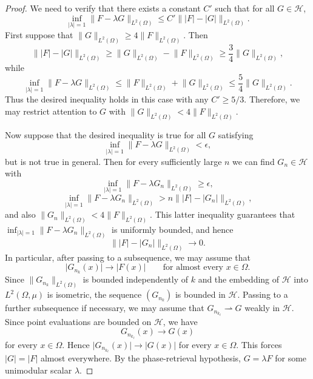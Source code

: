 \documentclass[11pt]{amsart}
\theoremstyle{remark}
\begin{document}
\begin{proof}
We need to verify that there exists a constant \(C'\) such that for all
\(G\in \mathcal{H}\),
\[
\inf_{\lvert \lambda \rvert=1}\lVert F-\lambda G \rVert_{L^2(\Omega)}
\le
C'\lVert \lvert F \rvert-\lvert G \rvert \rVert_{L^2(\Omega)}.
\]
First suppose that \(\lVert G \rVert_{L^2(\Omega)}\ge4\lVert F \rVert_{L^2(\Omega)}\).
Then
\[
\lVert \lvert F \rvert-\lvert G \rvert \rVert_{L^2(\Omega)}
\ge
\lVert G \rVert_{L^2(\Omega)}-\lVert F \rVert_{L^2(\Omega)}
\ge
\frac34\lVert G \rVert_{L^2(\Omega)},
\]
while
\[
\inf_{\lvert \lambda \rvert=1}\lVert F-\lambda G \rVert_{L^2(\Omega)}
\le
\lVert F \rVert_{L^2(\Omega)}+\lVert G \rVert_{L^2(\Omega)}
\le
\frac54\lVert G \rVert_{L^2(\Omega)}.
\]
Thus the desired inequality holds in this case with any \(C'\ge5/3\).
Therefore, we may restrict attention to \(G\) with
\(\lVert G \rVert_{L^2(\Omega)}<4\lVert F \rVert_{L^2(\Omega)}\).
 \vspace{0.5em}


Now suppose that the desired inequality is true for all \(G\) satisfying
\[
\inf_{\lvert \lambda \rvert=1}\lVert F-\lambda G \rVert_{L^2(\Omega)}<\epsilon,
\]
but is not true in general. Then for every sufficiently large \(n\) we can find \(G_n\in \mathcal{H}\)
with
\[
\inf_{\lvert \lambda \rvert=1}\lVert F-\lambda G_n \rVert_{L^2(\Omega)}\ge\epsilon,
\]
\[
\inf_{\lvert \lambda \rvert=1}\lVert F-\lambda G_n \rVert_{L^2(\Omega)}
>
n\lVert \lvert F \rvert-\lvert G_n \rvert \rVert_{L^2(\Omega)},
\]
and also \(\lVert G_n \rVert_{L^2(\Omega)}<4\lVert F \rVert_{L^2(\Omega)}\). This latter
inequality guarantees that
\(\inf_{\lvert \lambda \rvert=1}\lVert F-\lambda G_n \rVert_{L^2(\Omega)}\) is uniformly
bounded, and hence
\[
\lVert \lvert F \rvert-\lvert G_n \rvert \rVert_{L^2(\Omega)}\to0.
\]
In particular, after passing to a subsequence, we may assume that
\[
\lvert G_{n_k}(x) \rvert\to\lvert F(x) \rvert
\qquad\text{for almost every }x\in\Omega.
\]
Since \(\lVert G_{n_k} \rVert_{L^2(\Omega)}\) is bounded independently of \(k\) and
the embedding of \(\mathcal{H}\) into \(L^2(\Omega,\mu)\) is isometric, the sequence
\((G_{n_k})\) is bounded in \(\mathcal{H}\). Passing to a further subsequence if
necessary, we may assume that \(G_{n_{k_\ell}}\rightharpoonup G\) weakly in
\(\mathcal{H}\). Since point evaluations are bounded on \(\mathcal{H}\), we have
\[
G_{n_{k_\ell}}(x)\to G(x)
\]
for every \(x\in\Omega\). Hence \(\lvert G_{n_{k_\ell}}(x) \rvert\to\lvert G(x) \rvert\) for
every \(x\in\Omega\). This forces \(\lvert G \rvert=\lvert F \rvert\) almost everywhere. By the
phase-retrieval hypothesis, \(G=\lambda F\) for some unimodular scalar \(\lambda\).
 \vspace{0.5em}


\end{proof}
\end{document}

